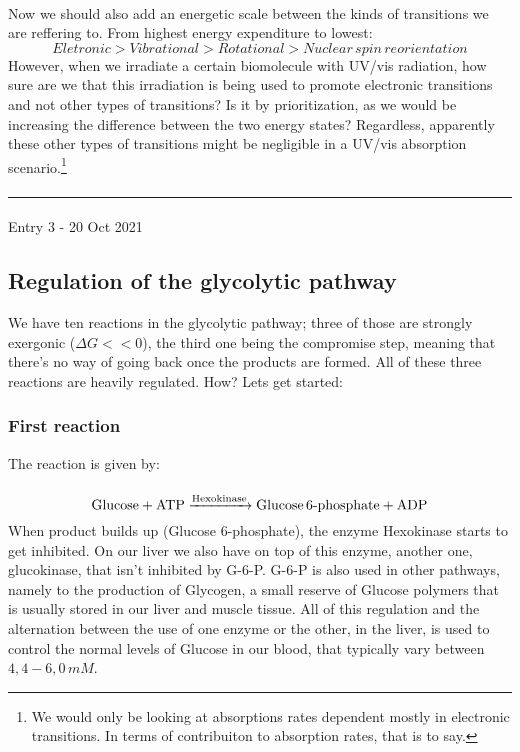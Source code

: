\documentclass[12pt,  letterpaper]{article}
\begin{document}
\paragraph*{}
Now we should also add an energetic scale between the kinds of transitions we are reffering to. From highest energy expenditure to lowest:
\begin{equation}
Eletronic > Vibrational > Rotational > Nuclear\,spin\,reorientation
\end{equation}
However, when we irradiate a certain biomolecule with UV/vis radiation, how sure are we that this irradiation is being used to promote electronic transitions and not other types of transitions? Is it by prioritization, as we would be increasing the difference between the two energy states? Regardless, apparently these other types of transitions might be negligible in a UV/vis absorption scenario.\footnote{We would only be looking at absorptions rates dependent mostly in electronic transitions. In terms of contribuiton to absorption rates, that is to say.}
\paragraph*{}
\hrule
\paragraph*{}
Entry 3 - 20 Oct 2021
\paragraph*{}
\subsection*{Regulation of the glycolytic pathway}
We have ten reactions in the glycolytic pathway; three of those are strongly exergonic ($\Delta G << 0$), the third one being the compromise step, meaning that there's no way of going back once the products are formed. All of these three reactions are heavily regulated. How? Lets get started:
\subsubsection*{First reaction}
The reaction is given by:
\paragraph*{}
\begin{equation}
\ce{Glucose + ATP ->[Hexokinase] Glucose 6-phosphate + ADP}
\end{equation}
When product builds up (Glucose 6-phosphate), the enzyme Hexokinase starts to get inhibited. On our liver we also have on top of this enzyme, another one, glucokinase, that isn't inhibited by G-6-P. G-6-P is also used in other pathways, namely to the production of Glycogen, a small reserve of Glucose polymers that is usually stored in our liver and muscle tissue. All of this regulation and the alternation between the use of one enzyme or the other, in the liver, is used to control the normal levels of Glucose in our blood, that typically vary between $4,4-6,0\,mM$.
\end{document}
